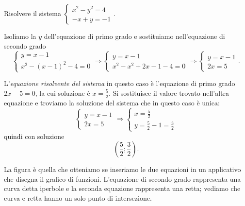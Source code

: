 \begin{esempio}
Risolvere il sistema 
\(\left\{\begin{array}{l}x^2-y^2=4\\-x+y=-1\end{array}\right.\).

Isoliamo la \(y\) dell'equazione di primo grado e sostituiamo nell'equazione di 
secondo grado 
\[\left\{\begin{array}{l}y=x-1 \\
x^2-(x-1)^2-4=0\end{array}\right.
\Rightarrow \left\{\begin{array}{l}y=x-1 \\
x^2-x^2+2x-1-4=0\end{array}\right.
\Rightarrow \left\{\begin{array}{l}y=x-1\\2x=5\end{array}\right..\]

L'\emph{equazione risolvente del sistema} in questo caso è l'equazione di primo 
grado \(2x-5=0\), la cui soluzione è \(x=\frac 5 2\). Si sostituisce il valore 
trovato nell'altra equazione e troviamo la soluzione del sistema che in questo 
caso è unica: 
\[\left\{\begin{array}{l}y=x-1 \\2x=5\end{array}\right. 
\Rightarrow\left\{\begin{array}{l}x=\frac 5 2 \\
y=\frac 5 2-1=\frac 3 2\end{array}\right.\] 
quindi con soluzione \[\left(\frac 5 2;\frac 3 2\right).\]

\begin{multicols}{2}
La figura è quella che otteniamo se inseriamo le due equazioni in un 
applicativo 
che disegna il grafico di funzioni. L'equazione di secondo grado rappresenta 
una curva detta iperbole e la seconda equazione rappresenta una retta; 
vediamo che curva e retta hanno un solo punto di intersezione.
\begin{center}

\end{center}
\end{multicols}
\end{esempio}
